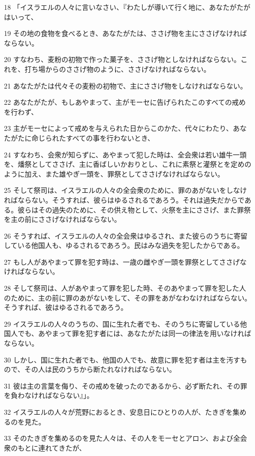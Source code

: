 \par 18 「イスラエルの人々に言いなさい、『わたしが導いて行く地に、あなたがたがはいって、
\par 19 その地の食物を食べるとき、あなたがたは、ささげ物を主にささげなければならない。
\par 20 すなわち、麦粉の初物で作った菓子を、ささげ物としなければならない。これを、打ち場からのささげ物のように、ささげなければならない。
\par 21 あなたがたは代々その麦粉の初物で、主にささげ物をしなければならない。
\par 22 あなたがたが、もしあやまって、主がモーセに告げられたこのすべての戒めを行わず、
\par 23 主がモーセによって戒めを与えられた日からこのかた、代々にわたり、あなたがたに命じられたすべての事を行わないとき、
\par 24 すなわち、会衆が知らずに、あやまって犯した時は、全会衆は若い雄牛一頭を、燔祭としてささげ、主に香ばしいかおりとし、これに素祭と灌祭とを定めのように加え、また雄やぎ一頭を、罪祭としてささげなければならない。
\par 25 そして祭司は、イスラエルの人々の全会衆のために、罪のあがないをしなければならない。そうすれば、彼らはゆるされるであろう。それは過失だからである。彼らはその過失のために、その供え物として、火祭を主にささげ、また罪祭を主の前にささげなければならない。
\par 26 そうすれば、イスラエルの人々の全会衆はゆるされ、また彼らのうちに寄留している他国人も、ゆるされるであろう。民はみな過失を犯したからである。
\par 27 もし人があやまって罪を犯す時は、一歳の雌やぎ一頭を罪祭としてささげなければならない。
\par 28 そして祭司は、人があやまって罪を犯した時、そのあやまって罪を犯した人のために、主の前に罪のあがないをして、その罪をあがなわなければならない。そうすれば、彼はゆるされるであろう。
\par 29 イスラエルの人々のうちの、国に生れた者でも、そのうちに寄留している他国人でも、あやまって罪を犯す者には、あなたがたは同一の律法を用いなければならない。
\par 30 しかし、国に生れた者でも、他国の人でも、故意に罪を犯す者は主を汚すもので、その人は民のうちから断たれなければならない。
\par 31 彼は主の言葉を侮り、その戒めを破ったのであるから、必ず断たれ、その罪を負わなければならない』」。
\par 32 イスラエルの人々が荒野におるとき、安息日にひとりの人が、たきぎを集めるのを見た。
\par 33 そのたきぎを集めるのを見た人々は、その人をモーセとアロン、および全会衆のもとに連れてきたが、
